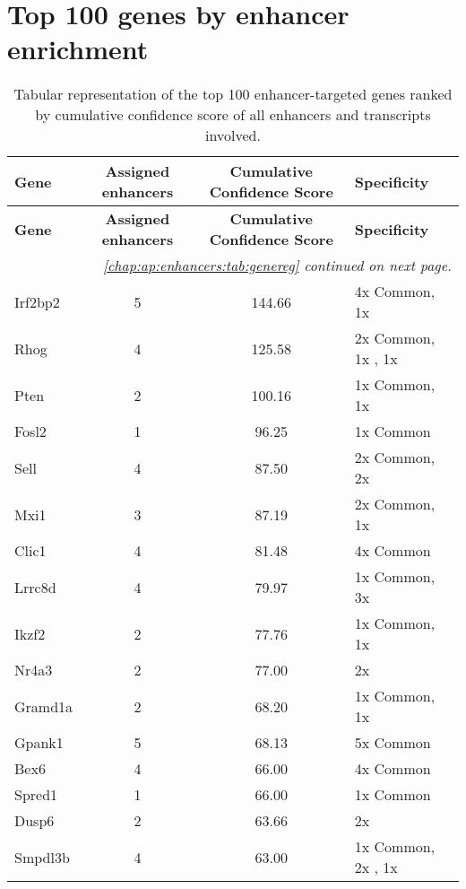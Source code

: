 \section{Top 100 genes by enhancer enrichment}
{ \footnotesize
	\begin{longtable}[l]{lccl}
       \textbf{Gene}	& \textbf{Assigned enhancers}	& \textbf{Cumulative Confidence Score} & \textbf{Specificity}\\ 
		\hline
		\label{chap:ap:enhancers:tab:genereg}	
		\endfirsthead 
        \textbf{Gene}	& \textbf{Assigned enhancers}	& \textbf{Cumulative Confidence Score} & \textbf{Specificity}\\ 
		\hline
		\endhead 
		\hline
		\multicolumn{4}{r}{\textit{\autoref{chap:ap:enhancers:tab:genereg} continued on next page.}}\\
		\endfoot
		\hline
		\caption{Tabular representation of the top 100 enhancer-targeted genes ranked by cumulative confidence score of all enhancers and transcripts involved.}
		\endlastfoot
Irf2bp2	&  \num{5}	&  \num{144.66}	& 4x Common, 1x  \dnmtwtregular\\ 
Rhog	&  \num{4}	&  \num{125.58}	& 2x Common, 1x  \dnmtchipregular, 1x  \dnmtwtregular\\ 
Pten	&  \num{2}	&  \num{100.16}	& 1x Common, 1x  \dnmtchipregular\\ 
Fosl2	&  \num{1}	&  \num{ 96.25}	& 1x Common\\ 
Sell	&  \num{4}	&  \num{ 87.50}	& 2x Common, 2x  \dnmtwtregular\\ 
Mxi1	&  \num{3}	&  \num{ 87.19}	& 2x Common, 1x  \dnmtchipregular\\ 
Clic1	&  \num{4}	&  \num{ 81.48}	& 4x Common\\ 
Lrrc8d	&  \num{4}	&  \num{ 79.97}	& 1x Common, 3x  \dnmtchipregular\\ 
Ikzf2	&  \num{2}	&  \num{ 77.76}	& 1x Common, 1x  \dnmtwtregular\\ 
Nr4a3	&  \num{2}	&  \num{ 77.00}	& 2x  \dnmtwtregular\\ 
Gramd1a	&  \num{2}	&  \num{ 68.20}	& 1x Common, 1x  \dnmtchipregular\\ 
Gpank1	&  \num{5}	&  \num{ 68.13}	& 5x Common\\ 
Bex6	&  \num{4}	&  \num{ 66.00}	& 4x Common\\ 
Spred1	&  \num{1}	&  \num{ 66.00}	& 1x Common\\ 
Dusp6	&  \num{2}	&  \num{ 63.66}	& 2x  \dnmtwtregular\\ 
Smpdl3b	&  \num{4}	&  \num{ 63.00}	& 1x Common, 2x  \dnmtchipregular, 1x  \dnmtwtregular\\ 

\end{longtable}}
